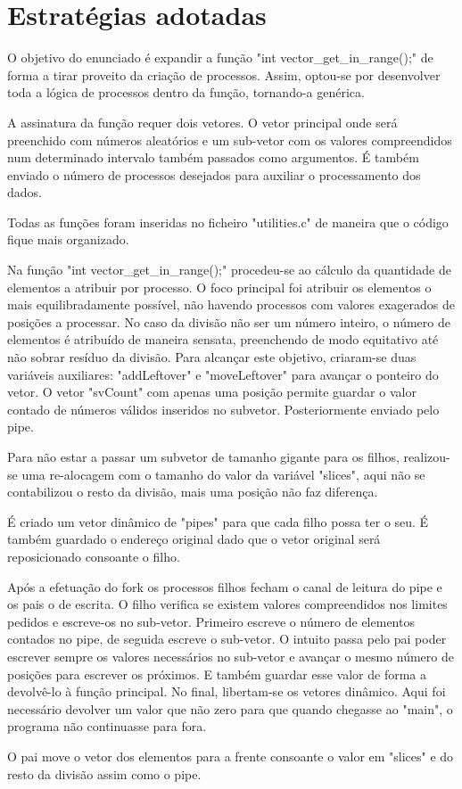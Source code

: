 \documentclass[11pt,a4paper]{report}
\begin{document}
    \section{Estratégias adotadas}
        O objetivo do enunciado é expandir a função "int vector_get_in_range();" de forma a tirar proveito da criação de processos. Assim, optou-se por desenvolver toda a
        lógica de processos dentro da função, tornando-a genérica.

        A assinatura da função requer dois vetores. O vetor principal onde será preenchido com números aleatórios e um sub-vetor com os valores compreendidos num
        determinado intervalo também passados como argumentos. É também enviado o número de processos desejados para auxiliar o processamento dos dados.

        Todas as funções foram inseridas no ficheiro "utilities.c" de maneira que o código fique mais organizado.

        Na função "int vector_get_in_range();" procedeu-se ao cálculo da quantidade de elementos a atribuir por processo.
        O foco principal foi atribuir os elementos o
        mais equilibradamente possível, não havendo processos com valores exagerados de posições a processar. No caso da divisão não ser um número inteiro, o número de
        elementos é atribuído de maneira sensata, preenchendo de modo equitativo até não sobrar resíduo da divisão. Para alcançar este objetivo, criaram-se duas
        variáveis auxiliares: "addLeftover" e "moveLeftover" para avançar o ponteiro do vetor.
        O vetor "svCount" com apenas uma posição permite guardar o valor contado de números válidos inseridos no subvetor. Posteriormente enviado pelo pipe.

        Para não estar a passar um subvetor de tamanho gigante para os filhos, realizou-se uma re-alocagem com o tamanho do valor da variável "slices", aqui não se
        contabilizou o resto da divisão, mais uma posição não faz diferença.

        É criado um vetor dinâmico de "pipes" para que cada filho possa ter o seu. É também guardado o endereço original dado que o vetor original será
        reposicionado consoante o filho.

        Após a efetuação do fork os processos filhos fecham o canal de leitura do pipe e os pais o de escrita.
        O filho verifica se existem valores compreendidos nos limites pedidos e escreve-os no sub-vetor. Primeiro escreve o número de elementos contados no pipe, de
        seguida escreve o sub-vetor. O intuito passa pelo pai poder escrever sempre os valores necessários no sub-vetor e avançar o mesmo número de posições para
        escrever os próximos. E também guardar esse valor de forma a devolvê-lo à função principal. No final, libertam-se os vetores dinâmico.
        Aqui foi necessário devolver um valor que não zero para que quando chegasse ao "main", o programa não continuasse para fora.

        O pai move o vetor dos elementos para a frente consoante o valor em "slices" e do resto da divisão assim como o pipe.
\end{document}
